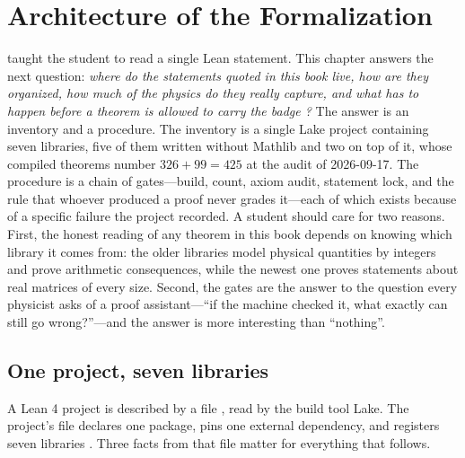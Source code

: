 \chapter{Architecture of the Formalization}\label{ch:architecture}

 taught the student to read a single Lean statement. This chapter
answers the next question: \emph{where do the statements quoted in this book live, how are
they organized, how much of the physics do they really capture, and what has to happen before
a theorem is allowed to carry the badge \TA?} The answer is an inventory and a procedure. The
inventory is a single Lake project containing seven libraries, five of them written without
Mathlib and two on top of it, whose compiled theorems number $326+99=425$ at the audit of
2026-09-17. The procedure is a chain of gates---build,  count, axiom audit,
statement lock, and the rule that whoever produced a proof never grades it---each of which
exists because of a specific failure the project recorded. A student should care for two
reasons. First, the honest reading of any theorem in this book depends on knowing which
library it comes from: the older libraries model physical quantities by integers and prove
arithmetic consequences, while the newest one proves statements about real matrices of every
size. Second, the gates are the answer to the question every physicist asks of a proof
assistant---``if the machine checked it, what exactly can still go wrong?''---and the answer
is more interesting than ``nothing''.

\section{One project, seven libraries}\label{sec:architecture:libraries}

A Lean 4 project is described by a file , read by the
build tool Lake. The project's file declares one package, pins one external dependency, and
registers seven libraries . Three facts from that file
matter for everything that follows.

